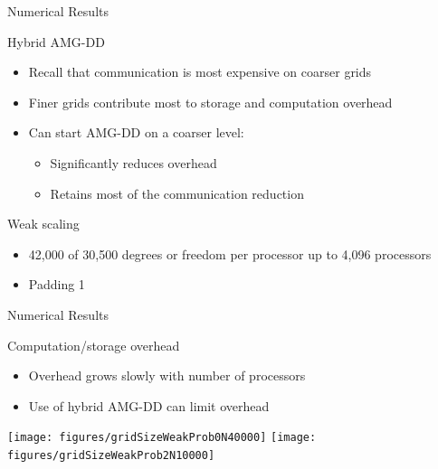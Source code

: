 \documentclass[18pt,xcolor=table]{beamer}
\begin{document}
\begin{frame}{Numerical Results}


\begin{block}{Hybrid AMG-DD}
\begin{itemize}
\item Recall that communication is most expensive on coarser grids
\item Finer grids contribute most to storage and computation overhead
\item Can start AMG-DD on a coarser level:
\begin{itemize}
   \item Significantly reduces overhead 
   \item Retains most of the communication reduction
\end{itemize}
\end{itemize}
\end{block}

\begin{block}{Weak scaling}
\begin{itemize}
\item 42,000 of 30,500 degrees or freedom per processor up to 4,096 processors
\item Padding 1
\end{itemize}
\end{block}

\end{frame}

\begin{frame}{Numerical Results}
\begin{block}{Computation/storage overhead}
\begin{itemize}
\item Overhead grows slowly with number of processors
\item Use of hybrid AMG-DD can limit overhead
\end{itemize}
\end{block}

\centering
\vspace{0.5 cm}
\texttt{[image: figures/gridSizeWeakProb0N40000]}
\texttt{[image: figures/gridSizeWeakProb2N10000]}

\end{frame}
\end{document}
